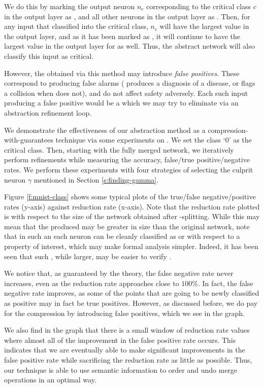 We do this by marking the output neuron $n_c$ corresponding to the critical
class $c$ in the output layer as \inc, and all other neurons in the output layer
as \dec.  Then, for any input that \cnc classified into
the critical class, $n_c$ will have the largest value in the
output layer, and as it has been marked as \inc, it will continue to have the
largest value in the output layer for \abs as well. Thus, the
abstract network will also classify this input as critical. 

However, the \abs obtained via this method may introduce
\emph{false positives}. These correspond to producing false alarms (\abs
produces a diagnosis of a disease, or flags a collision when \cnc does not), and
do not affect safety adversely. Each such input producing a false positive
would be a \gencex which we may try to eliminate via an abstraction refinement
loop.

We demonstrate the effectiveness of our abstraction method as a
compression-with-guarantees technique via some experiments on \mnist. We set the
class `0' as the critical class. Then, starting with the fully merged network,
we iteratively perform refinements while measuring the accuracy, false/true
positive/negative rates. We perform these experiments with four strategies of
selecting the culprit neuron $\gamma$ mentioned in Section
\ref{s:finding-gamma}.

Figure \ref{f:mnist-class} shows some typical plots of the true/false
negative/positive rates (y-axis) against reduction rate (x-axis). Note that the
reduction rate plotted is with respect to the size of the network obtained after
\inc-\dec splitting. While this may mean that the \abs produced may be greater
in size than the original network, note that in such an \abs each neuron can be
cleanly classified as \inc or \dec with respect to a property of interest, which
may make formal analysis simpler. Indeed, it has been seen that such \abs, while
larger, may be easier to verify \cite{cegar-nn}. 

We notice that, as guaranteed by the theory, the false negative rate never
increases, even as the reduction rate approaches close to $100\%$. In fact, the
false negative rate improves, as some of the points that are going
to be newly classified as positive may in fact be true positives.  
However, as discussed before, we do pay for the compression by introducing false
positives, which we see in the graph. 

We also find in the graph that there is a
small window of reduction rate values where almost all of the improvement in the
false positive rate occurs. This indicates that we are eventually able to make 
significant improvements in the false positive rate while sacrificing the
reduction rate as little as possible. Thus, our technique is able to use
semantic information to order and undo merge operations in an optimal way.
\vspace{-0.75cm}

